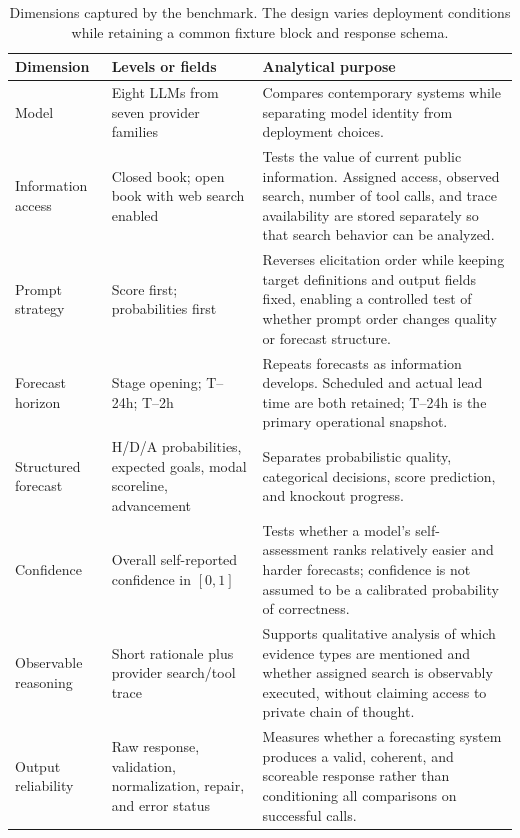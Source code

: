 \begin{table}[t]
  \caption{Dimensions captured by the benchmark. The design varies deployment conditions while
  retaining a common fixture block and response schema.}
  \label{tab:benchmark-dimensions}
  \centering
  \small
  \begin{tabularx}{\textwidth}{>{\raggedright\arraybackslash}p{}
    >{\raggedright\arraybackslash}p{}X}
    \toprule
    \textbf{Dimension} & \textbf{Levels or fields} & \textbf{Analytical purpose} \\
    \midrule
    Model & Eight LLMs from seven provider families &
    Compares contemporary systems while separating model identity from deployment choices. \\

    Information access & Closed book; open book with web search enabled &
    Tests the value of current public information. Assigned access, observed search, number of tool
    calls, and trace availability are stored separately so that search behavior can be analyzed. \\

    Prompt strategy & Score first; probabilities first &
    Reverses elicitation order while keeping target definitions and output fields fixed, enabling a
    controlled test of whether prompt order changes quality or forecast structure. \\

    Forecast horizon & Stage opening; T--24h; T--2h &
    Repeats forecasts as information develops. Scheduled and actual lead time are both retained;
    T--24h is the primary operational snapshot. \\

    Structured forecast & H/D/A probabilities, expected goals, modal scoreline, advancement &
    Separates probabilistic quality, categorical decisions, score prediction, and knockout progress. \\

    Confidence & Overall self-reported confidence in $[0,1]$ &
    Tests whether a model's self-assessment ranks relatively easier and harder forecasts; confidence
    is not assumed to be a calibrated probability of correctness. \\

    Observable reasoning & Short rationale plus provider search/tool trace &
    Supports qualitative analysis of which evidence types are mentioned and whether assigned search
    is observably executed, without claiming access to private chain of thought. \\

    Output reliability & Raw response, validation, normalization, repair, and error status &
    Measures whether a forecasting system produces a valid, coherent, and scoreable response rather
    than conditioning all comparisons on successful calls. \\
    \bottomrule
  \end{tabularx}
\end{table}

